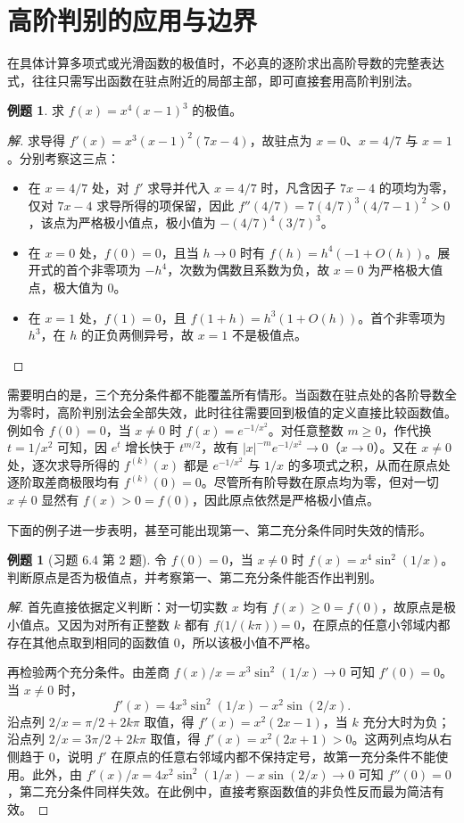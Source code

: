 \documentclass[UTF8,fontset=fandol,a4paper,12pt]{ctexart}
\theoremstyle{definition}
\newtheorem{example}[theorem]{例题}
\begin{document}
\section{高阶判别的应用与边界}
在具体计算多项式或光滑函数的极值时，不必真的逐阶求出高阶导数的完整表达式，往往只需写出函数在驻点附近的局部主部，即可直接套用高阶判别法。

\begin{example}
求 $f(x)=x^4(x-1)^3$ 的极值。
\end{example}

\begin{proof}[解]
求导得 $f'(x)=x^3(x-1)^2(7x-4)$，故驻点为 $x=0$、$x=4/7$ 与 $x=1$。分别考察这三点：
\begin{itemize}
\item 在 $x=4/7$ 处，对 $f'$ 求导并代入 $x=4/7$ 时，凡含因子 $7x-4$ 的项均为零，仅对 $7x-4$ 求导所得的项保留，因此 $f''(4/7)=7(4/7)^3(4/7-1)^2>0$，该点为严格极小值点，极小值为 $-(4/7)^4(3/7)^3$。
\item 在 $x=0$ 处，$f(0)=0$，且当 $h\to0$ 时有 $f(h)=h^4(-1+O(h))$。展开式的首个非零项为 $-h^4$，次数为偶数且系数为负，故 $x=0$ 为严格极大值点，极大值为 $0$。
\item 在 $x=1$ 处，$f(1)=0$，且 $f(1+h)=h^3(1+O(h))$。首个非零项为 $h^3$，在 $h$ 的正负两侧异号，故 $x=1$ 不是极值点。
\end{itemize}
\end{proof}

需要明白的是，三个充分条件都不能覆盖所有情形。当函数在驻点处的各阶导数全为零时，高阶判别法会全部失效，此时往往需要回到极值的定义直接比较函数值。例如令 $f(0)=0$，当 $x\ne0$ 时 $f(x)=e^{-1/x^2}$。对任意整数 $m\ge0$，作代换 $t=1/x^2$ 可知，因 $e^t$ 增长快于 $t^{m/2}$，故有 $|x|^{-m}e^{-1/x^2}\to0$（$x\to0$）。又在 $x\ne0$ 处，逐次求导所得的 $f^{(k)}(x)$ 都是 $e^{-1/x^2}$ 与 $1/x$ 的多项式之积，从而在原点处逐阶取差商极限均有 $f^{(k)}(0)=0$。尽管所有阶导数在原点均为零，但对一切 $x\ne0$ 显然有 $f(x)>0=f(0)$，因此原点依然是严格极小值点。

下面的例子进一步表明，甚至可能出现第一、第二充分条件同时失效的情形。

\begin{example}[习题 6.4 第 2 题]
令 $f(0)=0$，当 $x\ne0$ 时 $f(x)=x^4\sin^2(1/x)$。判断原点是否为极值点，并考察第一、第二充分条件能否作出判别。
\end{example}

\begin{proof}[解]
首先直接依据定义判断：对一切实数 $x$ 均有 $f(x)\ge0=f(0)$，故原点是极小值点。又因为对所有正整数 $k$ 都有 $f\bigl(1/(k\pi)\bigr)=0$，在原点的任意小邻域内都存在其他点取到相同的函数值 $0$，所以该极小值不严格。

再检验两个充分条件。由差商 $f(x)/x=x^3\sin^2(1/x)\to0$ 可知 $f'(0)=0$。当 $x\ne0$ 时，
\[
 f'(x)=4x^3\sin^2(1/x)-x^2\sin(2/x).
\]
沿点列 $2/x=\pi/2+2k\pi$ 取值，得 $f'(x)=x^2(2x-1)$，当 $k$ 充分大时为负；沿点列 $2/x=3\pi/2+2k\pi$ 取值，得 $f'(x)=x^2(2x+1)>0$。这两列点均从右侧趋于 $0$，说明 $f'$ 在原点的任意右邻域内都不保持定号，故第一充分条件不能使用。此外，由 $f'(x)/x=4x^2\sin^2(1/x)-x\sin(2/x)\to0$ 可知 $f''(0)=0$，第二充分条件同样失效。在此例中，直接考察函数值的非负性反而最为简洁有效。
\end{proof}
\end{document}
